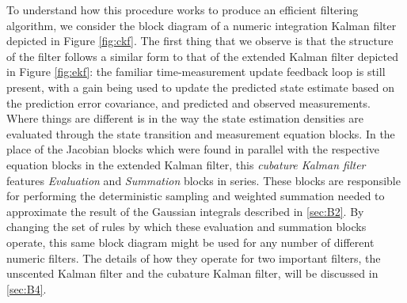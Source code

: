 To understand how this procedure works to produce an efficient filtering algorithm, we consider the block diagram of a numeric integration Kalman filter depicted in Figure \ref{fig:ckf}. The first thing that we observe is that the structure of the filter follows a similar form to that of the extended Kalman filter depicted in Figure \ref{fig:ekf}: the familiar time-measurement update feedback loop is still present, with a gain being used to update the predicted state estimate based on the prediction error covariance, and predicted and observed measurements. Where things are different is in the way the state estimation densities are evaluated through the state transition and measurement equation blocks. In the place of the Jacobian blocks which were found in parallel with the respective equation blocks in the extended Kalman filter, this \emph{cubature Kalman filter} features \emph{Evaluation} and \emph{Summation} blocks in series. These blocks are responsible for performing the deterministic sampling and weighted summation needed to approximate the result of the Gaussian integrals described in \ref{sec:B2}. By changing the set of rules by which these evaluation and summation blocks operate, this same block diagram might be used for any number of different numeric filters. The details of how they operate for two important filters, the unscented Kalman filter and the cubature Kalman filter, will be discussed in \ref{sec:B4}.

